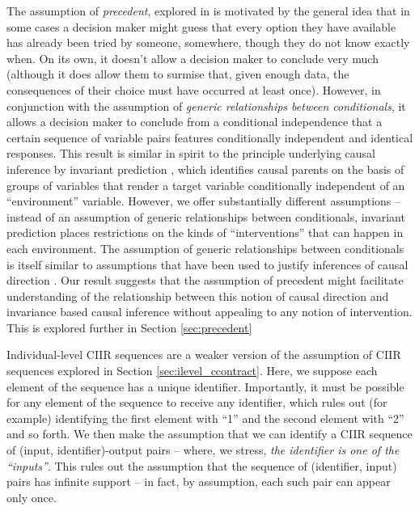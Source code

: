 The assumption of \emph{precedent}, explored in  is motivated by the general idea that in some cases a decision maker might guess that every option they have available has already been tried by someone, somewhere, though they do not know exactly when. On its own, it doesn't allow a decision maker to conclude very much (although it does allow them to surmise that, given enough data, the consequences of their choice must have occurred at least once). However, in conjunction with the assumption of \emph{generic relationships between conditionals}, it allows a decision maker to conclude from a conditional independence that a certain sequence of variable pairs features conditionally independent and identical responses. This result is similar in spirit to the principle underlying causal inference by invariant prediction \citep{peters_causal_2016}, which identifies causal parents on the basis of groups of variables that render a target variable conditionally independent of an ``environment'' variable. However, we offer substantially different assumptions -- instead of an assumption of generic relationships between conditionals, invariant prediction places restrictions on the kinds of ``interventions'' that can happen in each environment. The assumption of generic relationships between conditionals is itself similar to assumptions that have been used to justify inferences of causal direction \citep{meek_strong_1995,lemeire_replacing_2013}. Our result suggests that the assumption of precedent might facilitate understanding of the relationship between this notion of causal direction and invariance based causal inference without appealing to any notion of intervention. This is explored further in Section \ref{sec:precedent}

Individual-level CIIR sequences are a weaker version of the assumption of CIIR sequences explored in Section \ref{sec:ilevel_ccontract}. Here, we suppose each element of the sequence has a unique identifier. Importantly, it must be possible for any element of the sequence to receive any identifier, which rules out (for example) identifying the first element with ``1'' and the second element with ``2'' and so forth. We then make the assumption that we can identify a CIIR sequence of (input, identifier)-output pairs -- where, we stress, \emph{the identifier is one of the ``inputs''}. This rules out the assumption that the sequence of (identifier, input) pairs has infinite support -- in fact, by assumption, each such pair can appear only once. 

